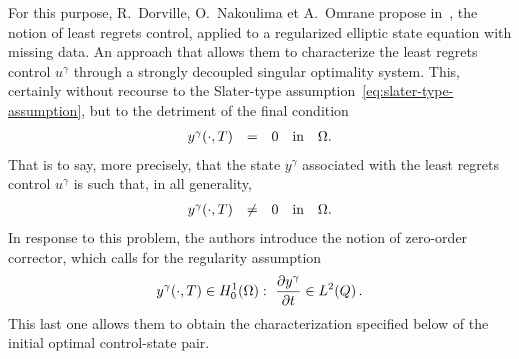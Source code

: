 For this purpose,  R.~Dorville, O.~Nakoulima et A.~Omrane propose
in~\cite{dorville}, the notion of least regrets control, applied to a
regularized elliptic state equation with missing data. An approach that
allows them to characterize the least regrets control $u^{\gamma}$ through
a strongly decoupled singular optimality system. This, certainly without
recourse to the Slater-type assumption~\eqref{eq:slater-type-assumption},
but to the detriment of the final condition
\begin{equation*}
    \begin{array}{rclll}
        {y^{\gamma}}\!\left({\cdot,T}\right) & = & 0 & \text{in} & \Omega.
    \end{array}
\end{equation*}
That is to say, more precisely, that the state $y^{\gamma}$ associated with
the least regrets control $u^{\gamma}$ is such that, in all generality,
\begin{equation*}
    \begin{array}{rclll}
        {y^{\gamma}}\!\left({\cdot,T}\right) & \neq & 0 & \text{in} & \Omega.
    \end{array}
\end{equation*}
In response to this problem, the authors introduce the notion of zero-order
corrector, which calls for the regularity assumption
\begin{equation}\label{eq:dorvilleassumption}
    {y^{\gamma}}\!\left({\cdot,T}\right)\in H_{0}^{1}(\Omega):\
    \dfrac{\partial{}y^{\gamma}}{\partial{}t}\in L^{2}\!\left({Q}\right).
\end{equation}
This last one allows them to obtain the characterization specified below of
the initial optimal control-state pair.

